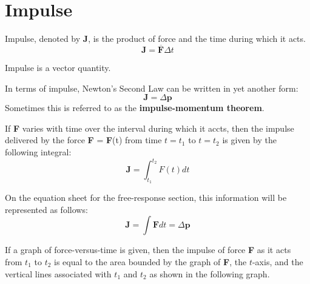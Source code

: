 \documentclass{article}
\begin{document}
\section{Impulse}
\begin{definition}
    Impulse, denoted by \textbf{J}, is the product of force and the time during which it acts.
    \begin{equation*}
        \textbf{J} = \overline{\textbf{F}}\Delta t
    \end{equation*}
\end{definition}
\begin{note}
    Impulse is a vector quantity.
\end{note}
\begin{theorem}
    In terms of impulse, Newton's Second Law can be written in yet another form:
    \begin{equation*}
        \textbf{J} = \Delta \textbf{p}
    \end{equation*}
    Sometimes this is referred to as the \textbf{impulse-momentum theorem}.
\end{theorem}
If \textbf{F} varies with time over the interval during which it accts, then the impulse delivered by the force \textbf{F} = \textbf{F}(t) from time $t = t_{1}$ to $t=t_{2}$ is given by the following integral:
\begin{equation*}
    \textbf{J} = \int_{t_{1}}^{t_{2}}F(t)dt
\end{equation*}
\begin{note}
    On the equation sheet for the free-response section, this information will be represented as follows:
    \begin{equation*}
        \textbf{J} = \int \textbf{F}dt = \Delta \textbf{p}
    \end{equation*}
\end{note}
If a graph of force-versus-time is given, then the impulse of force \textbf{F} as it acts from $t_{1}$ to $t_{2}$ is equal to the area bounded by the graph of \textbf{F}, the $t$-axis, and the vertical lines associated with $t_{1}$ and $t_{2}$ as shown in the following graph.
\end{document}
